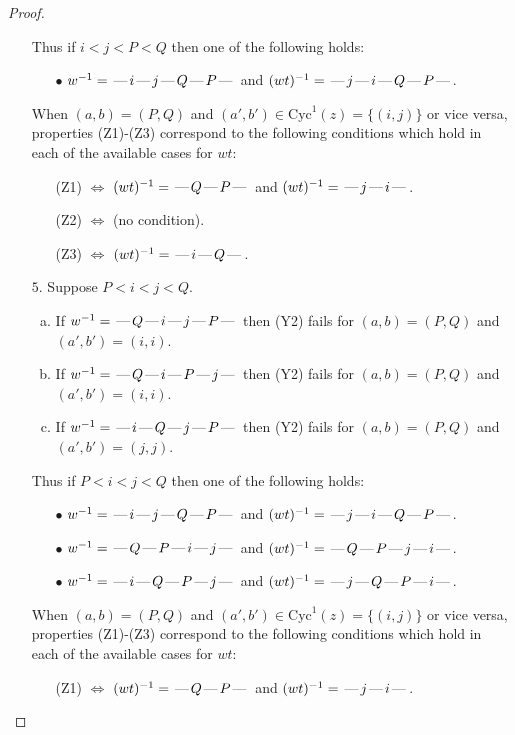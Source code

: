 \documentclass[10pt]{article}
\theoremstyle{definition}
\theoremstyle{definition}
\def\dash{\text{\hspace{0.5mm}---\hspace{0.5mm}}}
\def\Cyc{\mathrm{Cyc}}
\begin{document}
\begin{proof}
\begin{enumerate}
Thus if $i < j < P < Q$ then one of the following holds:
\begin{enumerate}
\item[$\bullet$] $w^{-1} = \dash i\dash j\dash Q\dash P\dash $ and $(wt)^{-1} = \dash j\dash i\dash Q\dash P\dash $.
\end{enumerate}
When $(a,b)= (P,Q)$ and $(a',b')\in \Cyc^1(z)=\{(i,j)\}$ or vice versa,
properties (Z1)-(Z3) correspond to the following conditions which
hold in each of the available cases for $wt$:
\begin{enumerate}
\item[](Z1) $\Leftrightarrow$ $(wt)^{-1} = \dash Q \dash P \dash$  and $(wt)^{-1} = \dash j \dash i \dash$.
\item[](Z2) $\Leftrightarrow$ (no condition).
\item[](Z3) $\Leftrightarrow$ $(wt)^{-1} = \dash i \dash Q \dash$.
\end{enumerate}
\item[$5$.] Suppose $P < i < j < Q$.
\begin{enumerate}[(a)]
\item If $w^{-1} = \dash Q\dash i\dash j\dash P\dash $ then (Y2) fails for $(a,b)=(P,Q)$ and $(a',b')=(i,i)$.
\item If $w^{-1} = \dash Q\dash i\dash P\dash j\dash $ then (Y2) fails for $(a,b)=(P,Q)$ and $(a',b')=(i,i)$.
\item If $w^{-1} = \dash i\dash Q\dash j\dash P\dash $ then (Y2) fails for $(a,b)=(P,Q)$ and $(a',b')=(j,j)$.
\end{enumerate}
Thus if $P < i < j < Q$ then one of the following holds:
\begin{enumerate}
\item[$\bullet$] $w^{-1} = \dash i\dash j\dash Q\dash P\dash $ and $(wt)^{-1} = \dash j\dash i\dash Q\dash P\dash $.
\item[$\bullet$] $w^{-1} = \dash Q\dash P\dash i\dash j\dash $ and $(wt)^{-1} = \dash Q\dash P\dash j\dash i\dash $.
\item[$\bullet$] $w^{-1} = \dash i\dash Q\dash P\dash j\dash $ and $(wt)^{-1} = \dash j\dash Q\dash P\dash i\dash $.
\end{enumerate}
When $(a,b)= (P,Q)$ and $(a',b')\in \Cyc^1(z)=\{(i,j)\}$ or vice versa,
properties (Z1)-(Z3) correspond to the following conditions which
hold in each of the available cases for $wt$:
\begin{enumerate}
\item[](Z1) $\Leftrightarrow$ $(wt)^{-1} = \dash Q \dash P \dash$  and $(wt)^{-1} = \dash j \dash i \dash$.

\end{enumerate}
\end{enumerate}
\end{proof}
\end{document}
